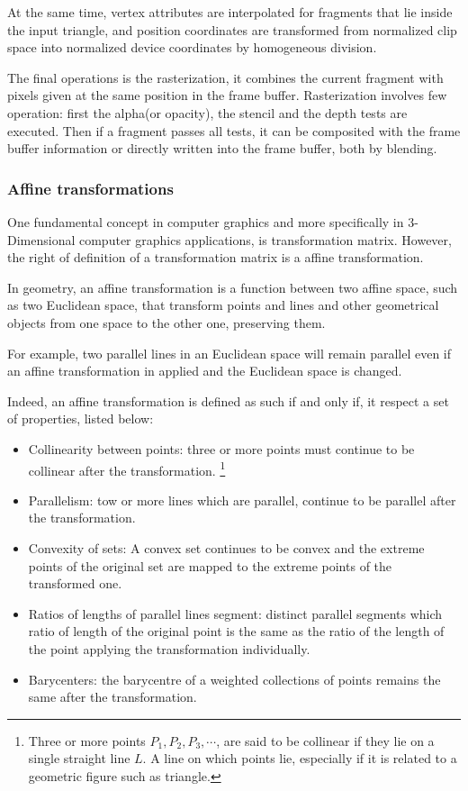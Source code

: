 \documentclass[12pt,a4paper]{extarticle}
\newcommand{\linespace}{\vspace{8pt}}
\begin{document}
At the same time, vertex attributes are interpolated for fragments that lie inside the input triangle, and position coordinates are transformed from normalized clip space into normalized device coordinates by homogeneous division.
\linespace

The final operations is the rasterization, it combines the current fragment with pixels given at the same position in the frame buffer. Rasterization involves few operation: first the alpha(or opacity), the stencil and the depth tests are executed. Then if a fragment passes all tests, it can be composited with the frame buffer information or directly written into the frame buffer, both by blending.
\subsubsection{Affine transformations}
One fundamental concept in computer graphics and more specifically in 3-Dimensional computer graphics applications, is transformation matrix. However, the right of definition of a transformation matrix is a affine transformation.


In geometry, an affine transformation is a function between two affine space, such as two Euclidean space, that transform points and lines and other geometrical objects from one space to the other one, preserving them. 

For example, two parallel lines in an Euclidean space will remain parallel even if an affine transformation in applied and the Euclidean space is changed.

Indeed, an affine transformation is defined as such if and only if, it respect a set of properties, listed below:
\begin{itemize}
\item Collinearity between points: three or more points must continue to be collinear after the transformation. \footnote{Three or more points $P_{1},P_{2},P_{3},\cdots$, are said to be collinear if they lie on a single straight line $L$. A line on which points lie, especially if it is related to a geometric figure such as triangle.} %
\item Parallelism: tow or more lines which are parallel, continue to be parallel after the transformation.
\item Convexity of sets: A convex set continues to be convex and the extreme points of the original set are mapped to the extreme points of the transformed one.
\item Ratios of lengths of parallel lines segment: distinct parallel segments which ratio of length of the original point is the same as the ratio of the length of the point applying the transformation individually.
\item Barycenters: the barycentre of a weighted collections of points remains the same after the transformation.
\end{itemize}
\end{document}
